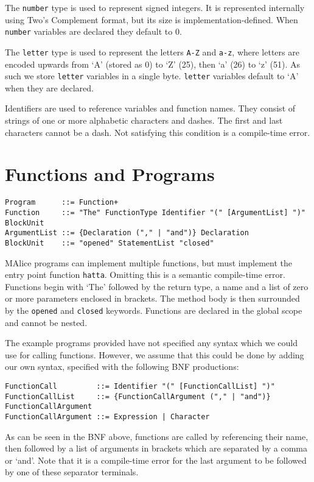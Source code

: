 \documentclass[a4wide, 11pt]{article}
\begin{document}
The \texttt{number} type is used to represent signed integers. It is represented internally using Two's Complement format, but its size is implementation-defined. When \texttt{number} variables are declared they default to 0.

The \texttt{letter} type is used to represent the letters \texttt{A-Z} and \texttt{a-z}, where letters are encoded upwards from `A' (stored as 0) to `Z' (25), then `a' (26) to `z' (51). As such we store \texttt{letter} variables in a single byte. \texttt{letter} variables default to `A' when they are declared.

Identifiers are used to reference variables and function names. They consist of strings of one or more alphabetic characters and dashes. The first and last characters cannot be a dash. Not satisfying this condition is a compile-time error.

\section{Functions and Programs}

\begin{verbatim}
Program      ::= Function+
Function     ::= "The" FunctionType Identifier "(" [ArgumentList] ")" BlockUnit
ArgumentList ::= {Declaration ("," | "and")} Declaration
BlockUnit    ::= "opened" StatementList "closed"
\end{verbatim}

MAlice programs can implement multiple functions, but must implement the entry point function \texttt{hatta}. Omitting this is a semantic compile-time error. Functions begin with `The' followed by the return type, a name and a list of zero or more parameters enclosed in brackets. The method body is then surrounded by the \texttt{opened} and \texttt{closed} keywords. Functions are declared in the global scope and cannot be nested.

The example programs provided have not specified any syntax which we could use for calling functions. However, we assume that this could be done by adding our own syntax, specified with the following BNF productions:

\begin{verbatim}
FunctionCall         ::= Identifier "(" [FunctionCallList] ")"
FunctionCallList     ::= {FunctionCallArgument ("," | "and")} FunctionCallArgument
FunctionCallArgument ::= Expression | Character
\end{verbatim}

As can be seen in the BNF above, functions are called by referencing their name, then followed by a list of arguments in brackets which are separated by a comma or `and'. Note that it is a compile-time error for the last argument to be followed by one of these separator terminals.
\end{document}
